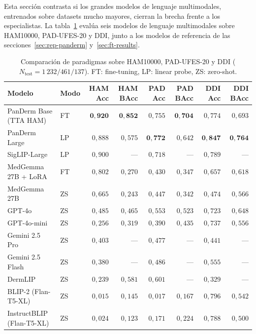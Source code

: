 Esta sección contrasta si los grandes modelos de lenguaje
multimodales, entrenados sobre datasets mucho mayores, cierran la
brecha frente a los especialistas. La
tabla~\ref{tab:llm-comparativa} evalúa seis modelos de lenguaje
multimodales sobre HAM10000, PAD-UFES-20 y DDI, junto a los modelos de
referencia de las secciones~\ref{sec:rep-panderm}
y~\ref{sec:ft-results}.

\begin{table}[htbp]
\centering
\footnotesize
\setlength{\tabcolsep}{4pt}
\renewcommand{\arraystretch}{0.95}
\caption{Comparación de paradigmas sobre HAM10000, PAD-UFES-20 y DDI
($N_{\mathrm{test}} = 1\,232 / 461 / 137$). FT: fine-tuning, LP:
linear probe, ZS: zero-shot.}
\label{tab:llm-comparativa}
\begin{tabular}{llrrrrrr}
\hline
Modelo                 & Modo  & HAM Acc       & HAM BAcc      & PAD Acc       & PAD BAcc      & DDI Acc       & DDI BAcc \\
\hline
PanDerm Base (TTA HAM) & FT    & $\mathbf{0{,}920}$ & $\mathbf{0{,}852}$ & $0{,}755$     & $\mathbf{0{,}704}$ & $0{,}774$     & $0{,}693$ \\
PanDerm Large          & LP    & $0{,}888$     & $0{,}575$     & $\mathbf{0{,}772}$ & $0{,}642$     & $\mathbf{0{,}847}$ & $\mathbf{0{,}764}$ \\
SigLIP-Large           & LP    & $0{,}900$     & ---           & $0{,}718$     & ---           & $0{,}789$     & --- \\
MedGemma 27B + LoRA    & FT    & $0{,}802$     & $0{,}270$     & $0{,}430$     & $0{,}347$     & $0{,}657$     & $0{,}618$ \\
MedGemma 27B           & ZS    & $0{,}665$     & $0{,}243$     & $0{,}447$     & $0{,}342$     & $0{,}474$     & $0{,}566$ \\
GPT-4o                 & ZS    & $0{,}485$     & $0{,}465$     & $0{,}553$     & $0{,}523$     & $0{,}723$     & $0{,}648$ \\
GPT-4o-mini            & ZS    & $0{,}256$     & $0{,}319$     & $0{,}390$     & $0{,}435$     & $0{,}737$     & $0{,}556$ \\
Gemini 2.5 Pro         & ZS    & $0{,}403$     & ---           & $0{,}477$     & ---           & $0{,}441$     & --- \\
Gemini 2.5 Flash       & ZS    & $0{,}380$     & ---           & $0{,}486$     & ---           & $0{,}555$     & --- \\
DermLIP                & ZS    & $0{,}239$     & $0{,}581$     & $0{,}601$     & ---           & $0{,}329$     & --- \\
BLIP-2 (Flan-T5-XL)    & ZS    & $0{,}015$     & $0{,}145$     & $0{,}017$     & $0{,}167$     & $0{,}796$     & $0{,}542$ \\
InstructBLIP (Flan-T5-XL)& ZS  & $0{,}024$     & $0{,}123$     & $0{,}171$     & $0{,}224$     & $0{,}788$     & $0{,}500$ \\
\hline
\end{tabular}
\end{table}

